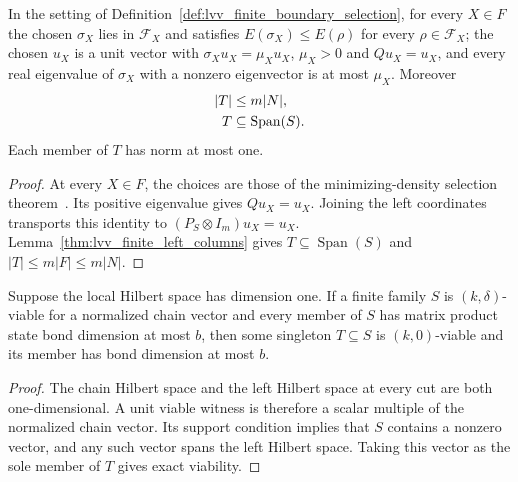 \begin{lemma}
    \label{thm:lvv_finite_boundary_selection}
    \leanok
    In the setting of Definition~\ref{def:lvv_finite_boundary_selection},
    for every $X\in F$ the chosen $\sigma_X$ lies in $\mathcal F_X$ and
    satisfies $E(\sigma_X)\le E(\rho)$ for every $\rho\in\mathcal F_X$;
    the chosen $u_X$ is a unit vector with $\sigma_Xu_X=\mu_Xu_X$,
    $\mu_X>0$ and $Qu_X=u_X$, and every real eigenvalue of $\sigma_X$ with a
    nonzero eigenvector is at most $\mu_X$. Moreover
    \begin{align}
        |T| & \le m|N|,\notag                        \\
        T   & \subseteq\operatorname{Span}(S).\notag
    \end{align}
    Each member of $T$ has norm at most one.
\end{lemma}
\begin{proof}\leanok
    At every $X\in F$, the choices are those of the minimizing-density selection
    theorem~\cite[``A minimizing density matrix and a leading eigenvector'']{QICLean2026Blueprint}.
    Its positive eigenvalue gives $Qu_X=u_X$. Joining the left coordinates
    transports this identity to $(P_S\otimes I_m)u_X=u_X$.
    Lemma~\ref{thm:lvv_finite_left_columns} gives
    $T\subseteq\operatorname{Span}(S)$ and $|T|\le m|F|\le m|N|$.
\end{proof}


\begin{lemma}
    \label{thm:lvv_size_trimmed_family_dimension_one}
    \leanok
    Suppose the local Hilbert space has dimension one.  If a finite family
    $S$ is $(k,\delta)$-viable for a normalized chain vector and every member
    of $S$ has matrix product state bond dimension at most $b$, then some
    singleton $T\subseteq S$ is $(k,0)$-viable and its member has bond
    dimension at most $b$.
\end{lemma}
\begin{proof}
    \leanok
    The chain Hilbert space and the left Hilbert space at every cut are both
    one-dimensional.  A unit viable witness is therefore a scalar multiple
    of the normalized chain vector.  Its support condition implies that
    $S$ contains a nonzero vector, and any such vector spans the left Hilbert
    space.  Taking this vector as the sole member of $T$ gives exact
    viability.
\end{proof}

